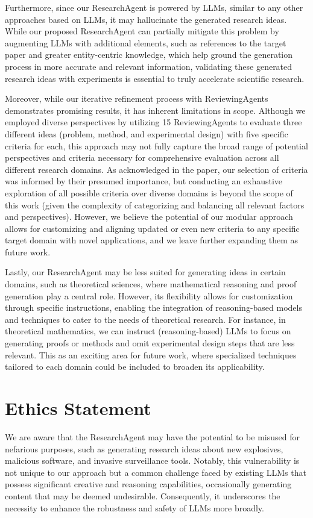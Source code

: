 \documentclass[11pt]{article}
\begin{document}
Furthermore, since our ResearchAgent is powered by LLMs, similar to any other approaches based on LLMs, it may hallucinate the generated research ideas. While our proposed ResearchAgent can partially mitigate this problem by augmenting LLMs with additional elements, such as references to the target paper and greater entity-centric knowledge, which help ground the generation process in more accurate and relevant information, validating these generated research ideas with experiments is essential to truly accelerate scientific research.

Moreover, while our iterative refinement process with ReviewingAgents demonstrates promising results, it has inherent limitations in scope. Although we employed diverse perspectives by utilizing 15 ReviewingAgents to evaluate three different ideas (problem, method, and experimental design) with five specific criteria for each, this approach may not fully capture the broad range of potential perspectives and criteria necessary for comprehensive evaluation across all different research domains. As acknowledged in the paper, our selection of criteria was informed by their presumed importance, but conducting an exhaustive exploration of all possible criteria over diverse domains is beyond the scope of this work (given the complexity of categorizing and balancing all relevant factors and perspectives). However, we believe the potential of our modular approach allows for customizing and aligning updated or even new criteria to any specific target domain with novel applications, and we leave further expanding them as future work.

Lastly, our ResearchAgent may be less suited for generating ideas in certain domains, such as theoretical sciences, where mathematical reasoning and proof generation play a central role. However, its flexibility allows for customization through specific instructions, enabling the integration of reasoning-based models and techniques to cater to the needs of theoretical research. For instance, in theoretical mathematics, we can instruct (reasoning-based) LLMs to focus on generating proofs or methods and omit experimental design steps that are less relevant. This as an exciting area for future work, where specialized techniques tailored to each domain could be included to broaden its applicability.

\section*{Ethics Statement}
We are aware that the ResearchAgent may have the potential to be misused for nefarious purposes, such as generating research ideas about new explosives, malicious software, and invasive surveillance tools. Notably, this vulnerability is not unique to our approach but a common challenge faced by existing LLMs that possess significant creative and reasoning capabilities, occasionally generating content that may be deemed undesirable. Consequently, it underscores the necessity to enhance the robustness and safety of LLMs more broadly. 
\end{document}
